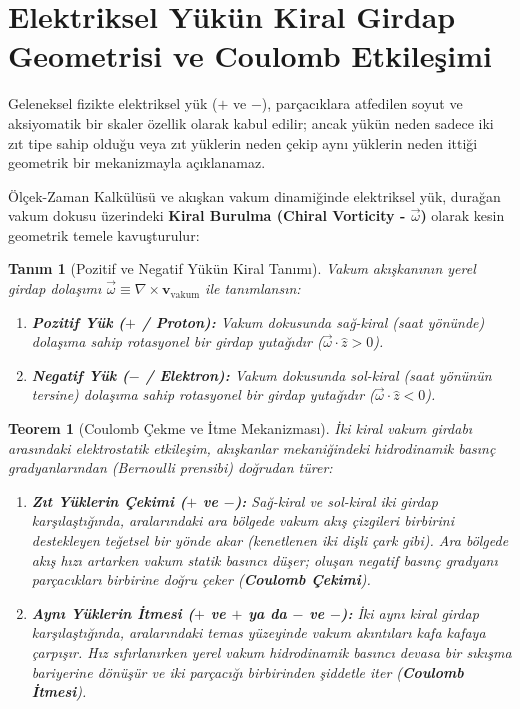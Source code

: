\documentclass[11pt,a4paper]{article}
\newtheorem{theorem}{Teorem}[section]
\newtheorem{definition}{Tanım}[section]
\begin{document}
\section{Elektriksel Yükün Kiral Girdap Geometrisi ve Coulomb Etkileşimi}
\label{sec:kiral_yuk_ve_coulomb}

Geleneksel fizikte elektriksel yük ($+$ ve $-$), parçacıklara atfedilen soyut ve aksiyomatik bir skaler özellik olarak kabul edilir; ancak yükün neden sadece iki zıt tipe sahip olduğu veya zıt yüklerin neden çekip aynı yüklerin neden ittiği geometrik bir mekanizmayla açıklanamaz.

Ölçek-Zaman Kalkülüsü ve akışkan vakum dinamiğinde elektriksel yük, durağan vakum dokusu üzerindeki \textbf{Kiral Burulma (Chiral Vorticity - $\vec{\omega}$)} olarak kesin geometrik temele kavuşturulur:

\begin{definition}[Pozitif ve Negatif Yükün Kiral Tanımı]
    \label{def:pozitif_negatif_yuk_kiral_p2}
    Vakum akışkanının yerel girdap dolaşımı $\vec{\omega} \equiv \nabla \times \mathbf{v}_{\mathrm{vakum}}$ ile tanımlansın:
    \begin{enumerate}
        \item \textbf{Pozitif Yük ($+$ / Proton):} Vakum dokusunda sağ-kiral (saat yönünde) dolaşıma sahip rotasyonel bir girdap yutağıdır ($\vec{\omega} \cdot \hat{z} > 0$).
        \item \textbf{Negatif Yük ($-$ / Elektron):} Vakum dokusunda sol-kiral (saat yönünün tersine) dolaşıma sahip rotasyonel bir girdap yutağıdır ($\vec{\omega} \cdot \hat{z} < 0$).
    \end{enumerate}
\end{definition}

\begin{theorem}[Coulomb Çekme ve İtme Mekanizması]
    \label{thm:coulomb_mekanizma_p2}
    İki kiral vakum girdabı arasındaki elektrostatik etkileşim, akışkanlar mekaniğindeki hidrodinamik basınç gradyanlarından (Bernoulli prensibi) doğrudan türer:
    \begin{enumerate}
        \item \textbf{Zıt Yüklerin Çekimi ($+$ ve $-$):} Sağ-kiral ve sol-kiral iki girdap karşılaştığında, aralarındaki ara bölgede vakum akış çizgileri birbirini destekleyen teğetsel bir yönde akar (kenetlenen iki dişli çark gibi). Ara bölgede akış hızı artarken vakum statik basıncı düşer; oluşan negatif basınç gradyanı parçacıkları birbirine doğru çeker (\textbf{Coulomb Çekimi}).
        \item \textbf{Aynı Yüklerin İtmesi ($+$ ve $+$ ya da $-$ ve $-$):} İki aynı kiral girdap karşılaştığında, aralarındaki temas yüzeyinde vakum akıntıları kafa kafaya çarpışır. Hız sıfırlanırken yerel vakum hidrodinamik basıncı devasa bir sıkışma bariyerine dönüşür ve iki parçacığı birbirinden şiddetle iter (\textbf{Coulomb İtmesi}).
    \end{enumerate}
\end{theorem}
\end{document}
